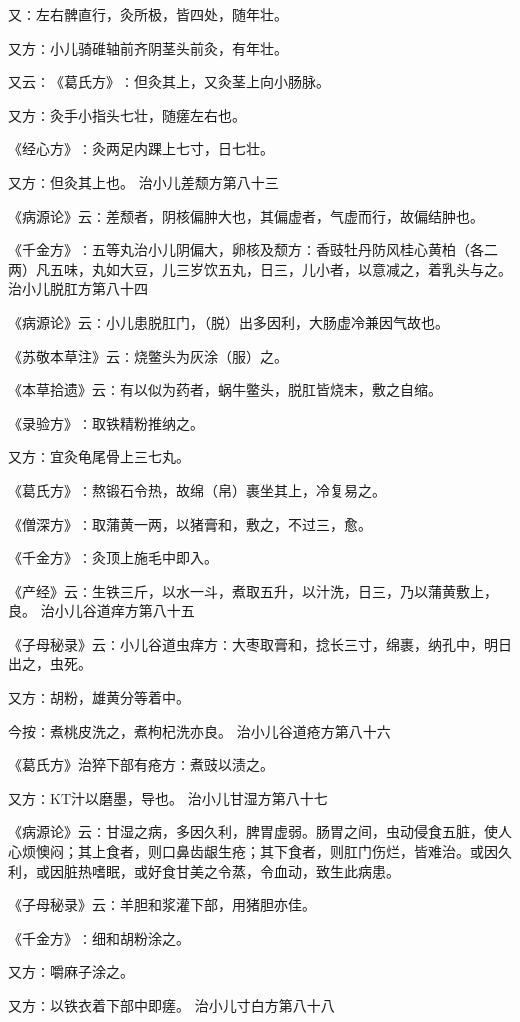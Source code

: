 \documentclass[a4paper,12pt,UTF8,twoside]{ctexbook}
\begin{document}
又∶左右髀直行，灸所极，皆四处，随年壮。

又方∶小儿骑碓轴前齐阴茎头前灸，有年壮。

又云∶《葛氏方》∶但灸其上，又灸茎上向小肠脉。

又方∶灸手小指头七壮，随瘥左右也。

《经心方》∶灸两足内踝上七寸，日七壮。

又方∶但灸其上也。
治小儿差颓方第八十三

《病源论》云∶差颓者，阴核偏肿大也，其偏虚者，气虚而行，故偏结肿也。

《千金方》∶五等丸治小儿阴偏大，卵核及颓方∶香豉牡丹防风桂心黄柏（各二两）凡五味，丸如大豆，儿三岁饮五丸，日三，儿小者，以意减之，着乳头与之。
治小儿脱肛方第八十四

《病源论》云∶小儿患脱肛门，（脱）出多因利，大肠虚冷兼因气故也。

《苏敬本草注》云∶烧鳖头为灰涂（服）之。

《本草拾遗》云∶有以似为药者，蜗牛鳖头，脱肛皆烧末，敷之自缩。

《录验方》∶取铁精粉推纳之。

又方∶宜灸龟尾骨上三七丸。

《葛氏方》∶熬锻石令热，故绵（帛）裹坐其上，冷复易之。

《僧深方》∶取蒲黄一两，以猪膏和，敷之，不过三，愈。

《千金方》∶灸顶上施毛中即入。

《产经》云∶生铁三斤，以水一斗，煮取五升，以汁洗，日三，乃以蒲黄敷上，良。
治小儿谷道痒方第八十五

《子母秘录》云∶小儿谷道虫痒方∶大枣取膏和，捻长三寸，绵裹，纳孔中，明日出之，虫死。

又方∶胡粉，雄黄分等着中。

今按∶煮桃皮洗之，煮枸杞洗亦良。
治小儿谷道疮方第八十六

《葛氏方》治猝下部有疮方∶煮豉以渍之。

又方∶KT汁以磨墨，导也。
治小儿甘湿方第八十七

《病源论》云∶甘湿之病，多因久利，脾胃虚弱。肠胃之间，虫动侵食五脏，使人心烦懊闷；其上食者，则口鼻齿龈生疮；其下食者，则肛门伤烂，皆难治。或因久利，或因脏热嗜眠，或好食甘美之令蒸，令血动，致生此病患。

《子母秘录》云∶羊胆和浆灌下部，用猪胆亦佳。

《千金方》∶细和胡粉涂之。

又方∶嚼麻子涂之。

又方∶以铁衣着下部中即瘥。
治小儿寸白方第八十八
\end{document}
